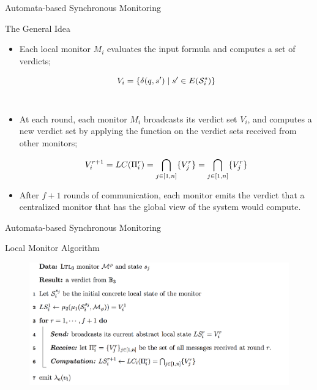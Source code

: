\begin{frame}{Automata-based Synchronous Monitoring}

\begin{block}{The General Idea}

\begin{itemize}

\item Each local monitor $M_i$ evaluates the input formula and computes a  set of verdicts;

$$V_i = \{\delta(q, s') \mid s' \in 
E(\mathcal{S}_i^s)\}$$ \\




\item At each round, each monitor $M_i$ broadcasts its verdict set $V_i$, and computes a new verdict set by applying the  function on the verdict sets received from other monitors;

$$V_i^{r+1} = LC(\Pi_i^r) = \bigcap_{j \in [1, n]} \{ V_j^r\} = 
\bigcap_{j \in [1, n]} \{V_j^r\}$$


\item After $f+1$ rounds of communication, each monitor emits the verdict that a centralized monitor that has the global view of the system would compute.


\end{itemize}

\end{block}

\end{frame}



\begin{frame}{Automata-based Synchronous Monitoring}

\begin{block}{Local Monitor Algorithm}

\begin{figure}
 \centering
 \includegraphics[scale=.3, angle=-360]{figures/localmonalgo2}
 \end{figure}

\end{block}

\end{frame}





